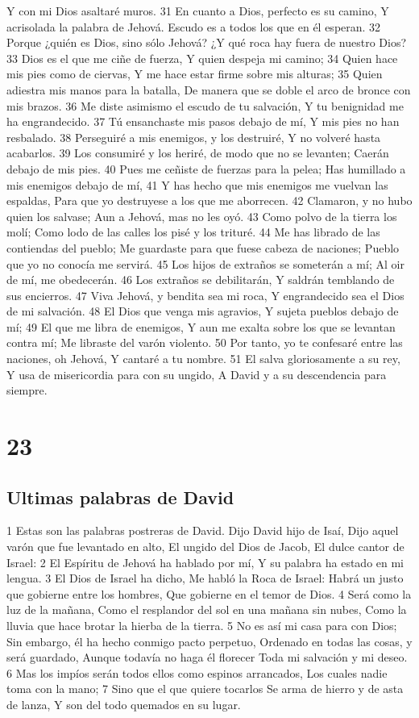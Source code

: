 Y con mi Dios asaltaré muros.
31 En cuanto a Dios, perfecto es su camino,
Y acrisolada la palabra de Jehová.
Escudo es a todos los que en él esperan.
32 Porque ¿quién es Dios, sino sólo Jehová?
¿Y qué roca hay fuera de nuestro Dios?
33 Dios es el que me ciñe de fuerza,
Y quien despeja mi camino;
34 Quien hace mis pies como de ciervas, 
Y me hace estar firme sobre mis alturas;
35 Quien adiestra mis manos para la batalla,
De manera que se doble el arco de bronce con mis brazos.
36 Me diste asimismo el escudo de tu salvación,
Y tu benignidad me ha engrandecido.
37 Tú ensanchaste mis pasos debajo de mí,
Y mis pies no han resbalado. 
38 Perseguiré a mis enemigos, y los destruiré,
Y no volveré hasta acabarlos.
39 Los consumiré y los heriré, de modo que no se levanten;
Caerán debajo de mis pies.
40 Pues me ceñiste de fuerzas para la pelea;
Has humillado a mis enemigos debajo de mí,
41 Y has hecho que mis enemigos me vuelvan las espaldas,
Para que yo destruyese a los que me aborrecen.
42 Clamaron, y no hubo quien los salvase;
Aun a Jehová, mas no les oyó.
43 Como polvo de la tierra los molí;
Como lodo de las calles los pisé y los trituré.
44 Me has librado de las contiendas del pueblo;
Me guardaste para que fuese cabeza de naciones;
Pueblo que yo no conocía me servirá.
45 Los hijos de extraños se someterán a mí;
Al oir de mí, me obedecerán.
46 Los extraños se debilitarán,
Y saldrán temblando de sus encierros.
47 Viva Jehová, y bendita sea mi roca,
Y engrandecido sea el Dios de mi salvación.
48 El Dios que venga mis agravios,
Y sujeta pueblos debajo de mí;
49 El que me libra de enemigos,
Y aun me exalta sobre los que se levantan contra mí;
Me libraste del varón violento.
50 Por tanto, yo te confesaré entre las naciones, oh Jehová,
Y cantaré a tu nombre. 
51 El salva gloriosamente a su rey,
Y usa de misericordia para con su ungido,
A David y a su descendencia para siempre.

\chapter{23}

\section*{Ultimas palabras de David}


1 Estas son las palabras postreras de David. 
Dijo David hijo de Isaí,
Dijo aquel varón que fue levantado en alto,
El ungido del Dios de Jacob,
El dulce cantor de Israel:
2 El Espíritu de Jehová ha hablado por mí,
Y su palabra ha estado en mi lengua.
3 El Dios de Israel ha dicho,
Me habló la Roca de Israel:
Habrá un justo que gobierne entre los hombres,
Que gobierne en el temor de Dios.
4 Será como la luz de la mañana,
Como el resplandor del sol en una mañana sin nubes,
Como la lluvia que hace brotar la hierba de la tierra.
5 No es así mi casa para con Dios;
Sin embargo, él ha hecho conmigo pacto perpetuo,
Ordenado en todas las cosas, y será guardado,
Aunque todavía no haga él florecer
Toda mi salvación y mi deseo.
6 Mas los impíos serán todos ellos como espinos arrancados,
Los cuales nadie toma con la mano;
7 Sino que el que quiere tocarlos
Se arma de hierro y de asta de lanza,
Y son del todo quemados en su lugar. 
